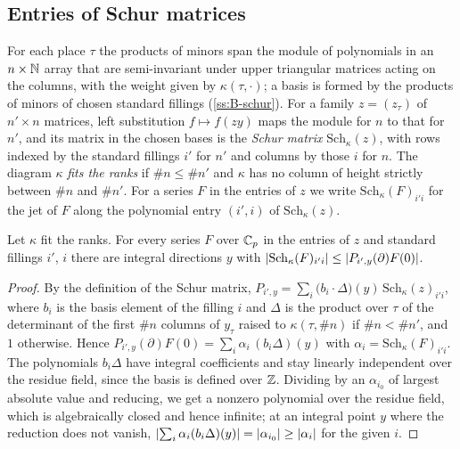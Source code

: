 \subsection{Entries of Schur matrices}\label{ss:schur-entries}
For each place $\tau$ the products of minors span the module of polynomials in an $n\times\mathbb{N}$ array
that are semi-invariant under upper triangular matrices acting on the columns, with the weight given
by $\kappa(\tau,\cdot)$; a basis is formed by the products of minors of chosen standard fillings
(\cref{ss:B-schur}). For a family $z=(z_\tau)$ of $n'\times n$ matrices, left substitution $f\mapsto
f(zy)$ maps the module for $n$ to that for $n'$, and its matrix in the chosen bases is the \emph{Schur
matrix} $\mathrm{Sch}_\kappa(z)$, with rows indexed by the standard fillings $i'$ for $n'$ and columns
by those $i$ for $n$. The diagram $\kappa$ \emph{fits the ranks} if $\#n\le\#n'$ and $\kappa$ has no
column of height strictly between $\#n$ and $\#n'$. For a series $F$ in the entries of $z$ we write
$\mathrm{Sch}_\kappa(F)_{i'i}$ for the jet of $F$ along the polynomial entry $(i',i)$ of
$\mathrm{Sch}_\kappa(z)$.

\begin{proposition}\label{prop:schur-entry}
Let $\kappa$ fit the ranks. For every series $F$ over $\mathbb{C}_p$ in the entries of $z$ and standard
fillings $i'$, $i$ there are integral directions $y$ with
$\lvert \mathrm{Sch}_\kappa(F)_{i'i}\rvert\le\lvert P_{i',y}(\partial)F(0)\rvert$.
\end{proposition}

\begin{proof}
By the definition of the Schur matrix,
$P_{i',y}=\sum_i\bigl(b_i\cdot\Delta\bigr)(y)\,\mathrm{Sch}_\kappa(z)_{i'i}$, where $b_i$ is the basis
element of the filling $i$ and $\Delta$ is the product over $\tau$ of the determinant of the first
$\#n$ columns of $y_\tau$ raised to $\kappa(\tau,\#n)$ if $\#n<\#n'$, and $1$ otherwise. Hence
$P_{i',y}(\partial)F(0)=\sum_i\alpha_i\,(b_i\Delta)(y)$ with $\alpha_i=\mathrm{Sch}_\kappa(F)_{i'i}$.
The polynomials $b_i\Delta$ have integral coefficients and stay linearly independent over the residue
field, since the basis is defined over $\mathbb{Z}$. Dividing by an $\alpha_{i_0}$ of largest absolute value
and reducing, we get a nonzero polynomial over the residue field, which is algebraically closed and
hence infinite; at an integral point $y$ where the reduction does not vanish,
$\lvert \sum_i\alpha_i(b_i\Delta)(y)\rvert=\lvert \alpha_{i_0}\rvert\ge\lvert \alpha_{i}\rvert$ for the given $i$.
\end{proof}
